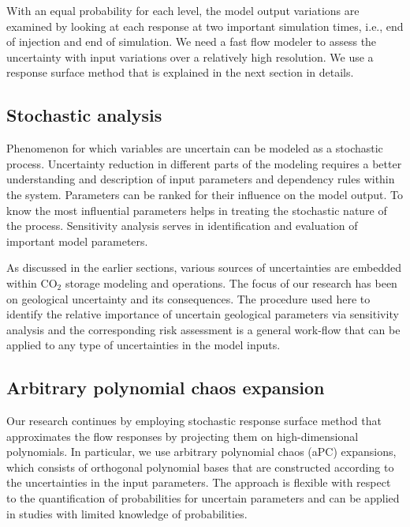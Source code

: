 With an equal probability for each level, the model output variations are
examined by looking at each response at two important simulation times, i.e., end of injection and end of simulation. We need a fast flow modeler to assess the uncertainty with input variations over a relatively high resolution. We use a response surface method that is explained in the next section in details. 

\subsection{Stochastic analysis}

Phenomenon for which variables are uncertain can be modeled as a stochastic process. Uncertainty reduction in different parts of the modeling requires a better understanding and description of input parameters and dependency rules within
the system. Parameters can be ranked for their influence on the
model output. To know the most influential parameters helps in treating the
stochastic nature of the process. Sensitivity analysis serves in identification and evaluation of important model
parameters. 

As discussed in the earlier sections, various sources of uncertainties are
embedded within $\mbox{CO}_{2}$ storage modeling and operations. The focus of
our research has been on geological uncertainty and its consequences. The
procedure used here to identify the relative importance of uncertain geological
parameters via sensitivity analysis and the corresponding risk assessment is a
general work-flow that can be applied to any type of uncertainties in the model
inputs.

\subsection{Arbitrary polynomial chaos expansion}

Our research continues by employing stochastic response surface method that approximates the flow responses by projecting them on high-dimensional
polynomials. In particular, we use arbitrary polynomial chaos (aPC) expansions, which consists of orthogonal polynomial bases that are constructed  according
to the uncertainties in the input parameters. The approach is flexible with
respect to the quantification of probabilities for uncertain parameters and can
be applied in studies with limited knowledge of probabilities. 

